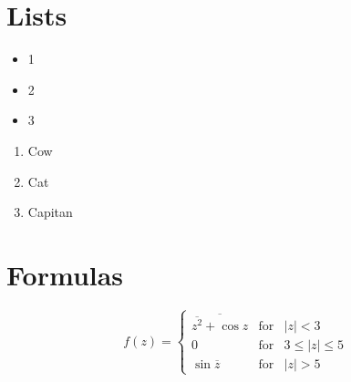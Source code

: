 \documentclass[a4paper,12pt,twoside]{article}
\begin{document}
\par

\newpage \section{Lists}

\par

\begin{itemize}

\par

\item 1 \item 2 \item 3             \end{itemize}

\par

\begin{enumerate}

\par

\item Cow \item Cat \item Capitan             \end{enumerate}

\par

\newpage

\par

\section{Formulas}

\par

$$f(z) = \left\{ \begin{array}{rcl} \overline{\overline{z^2}+\cos z} & \mbox{for} & |z|<3 \\ 0 & \mbox{for} & 3\leq|z|\leq5 \\ \sin\overline{z} & \mbox{for} & |z|>5 \end{array}\right.$$
\end{document}
